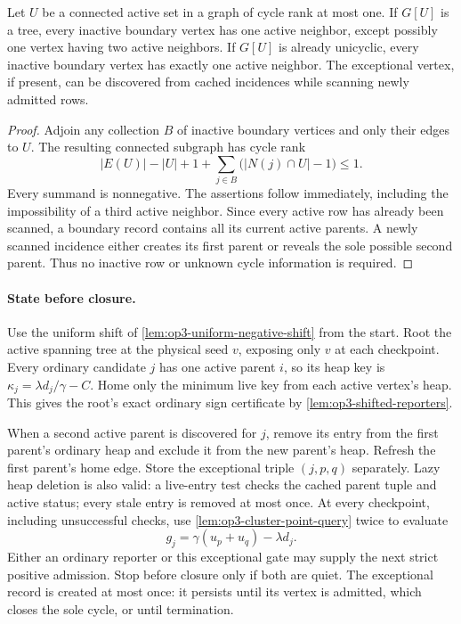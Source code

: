 \begin{lemma}
\label{lem:op3-unicyclic-exception}
Let $U$ be a connected active set in a graph of cycle rank at most one.
If $G[U]$ is a tree, every inactive boundary vertex has one active neighbor,
except possibly one vertex having two active neighbors. If $G[U]$ is
already unicyclic, every inactive boundary vertex has exactly one active
neighbor. The exceptional vertex, if present, can be discovered from
cached incidences while scanning newly admitted rows.
\end{lemma}
\begin{proof}
Adjoin any collection $B$ of inactive boundary vertices and only their edges
to $U$. The resulting connected subgraph has cycle rank
\[
 |E(U)|-|U|+1+\sum_{j\in B}\bigl(|N(j)\cap U|-1\bigr)\leq1.
\]
Every summand is nonnegative. The assertions follow immediately, including
the impossibility of a third active neighbor. Since every active row has
already been scanned, a boundary record contains all its current active
parents. A newly scanned incidence either creates its first parent or
reveals the sole possible second parent. Thus no inactive row or unknown
cycle information is required.
\end{proof}

\paragraph{State before closure.}
Use the uniform shift of \cref{lem:op3-uniform-negative-shift} from the
start. Root the active spanning tree at the physical seed $v$, exposing
only $v$ at each checkpoint. Every ordinary candidate $j$ has one active
parent $i$, so its heap key is $\kappa_j=\lambda d_j/\gamma-C$.
Home only the minimum live key from each active vertex's heap. This gives
the root's exact ordinary sign certificate by
\cref{lem:op3-shifted-reporters}.

When a second active parent is discovered for $j$, remove its entry from
the first parent's ordinary heap and exclude it from the new parent's
heap. Refresh the first parent's home edge. Store the exceptional triple
$(j,p,q)$ separately. Lazy heap deletion is also valid: a live-entry test
checks the cached parent tuple and active status; every stale entry is
removed at most once. At every checkpoint, including unsuccessful checks,
use \cref{lem:op3-cluster-point-query} twice to evaluate
\[
 g_j=\gamma(u_p+u_q)-\lambda d_j.
\]
Either an ordinary reporter or this exceptional gate may supply the next
strict positive admission. Stop before closure only if both are quiet.
The exceptional record is created at most once: it persists until its
vertex is admitted, which closes the sole cycle, or until termination.

